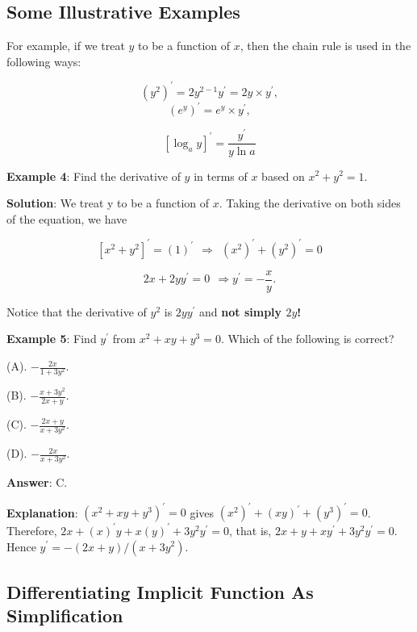 \documentclass[
]{book}
\begin{document}
\hfill\break

\hypertarget{some-illustrative-examples}{%
\subsection{Some Illustrative Examples}\label{some-illustrative-examples}}

For example, if we treat \(y\) to be a function of \(x\), then the chain rule is used in the following ways:

\[
(y^2)^\prime = 2y^{2-1}y^\prime = 2y\times y^\prime,
\]
\[
(e^y)^\prime = e^y\times y^\prime,
\]

\[
[\log_a y]^\prime = \frac{y^\prime}{y\ln a}
\]

\textbf{Example 4}: Find the derivative of \(y\) in terms of \(x\) based on \(x^2 + y^2 = 1\).

\textbf{Solution}: We treat y to be a function of \(x\). Taking the derivative on both sides of the equation, we have

\[
[x^2 + y^2]^\prime = (1)^\prime~~\Rightarrow~~ (x^2)^\prime + (y^2)^\prime =0
\]

\[
2x + 2yy^\prime = 0~~\Rightarrow y^\prime = -\frac{x}{y}.
\]

Notice that the derivative of \(y^2\) is \(2yy^\prime\) and \textbf{\color{red}not simply \(2y\)!}

\textbf{Example 5}: Find \(y^\prime\) from \(x^2 + xy + y^3 = 0\). Which of the following is correct?

(A). \(-\frac{2x}{1+3y^2}\).

(B). \(-\frac{x+3y^2}{2x+y}\).

(C). \(-\frac{2x+y}{x+3y^2}\).

(D). \(-\frac{2x}{x+3y^2}\).

\textbf{Answer}: C.

\textbf{Explanation}: \((x^2 + xy + y^3)^\prime = 0\) gives \((x^2)^\prime + (xy)^\prime + (y^3)^\prime = 0\). Therefore, \(2x + (x)^\prime y + x(y)^\prime + 3y^2 y^\prime = 0\), that is, \(2x+y+xy^\prime + 3y^2y^\prime = 0\). Hence \(y^\prime = -(2x+y)/(x+3y^2)\).

\hypertarget{differentiating-implicit-function-as-simplification}{%
\subsection{Differentiating Implicit Function As Simplification}\label{differentiating-implicit-function-as-simplification}}
\end{document}

